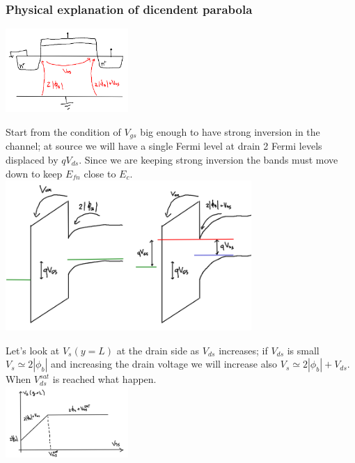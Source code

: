 \subsubsection{Physical explanation of dicendent parabola}


\centering
\includegraphics[width=0.35\textwidth]{f1.png}\\
\raggedright

Start from the condition of $V_{gs}$ big enough to have strong inversion in the channel; at source we will have a single Fermi level at drain 2 Fermi levels displaced by $qV_{ds}$. Since we are keeping strong inversion the bands must move down to keep $E_{fn}$ close to $E_c$.\\

\centering
\includegraphics[width=0.7\textwidth]{f2.png}\\
\raggedright


Let's look at $V_s(y=L)$ at the drain side as $V_{ds}$ increases; if $V_{ds}$ is small $V_s\simeq 2|\phi_b|$ and increasing the drain voltage we will increase also $V_s\simeq 2|\phi_b|+V_{ds}$. When $V_{ds}^{sat}$ is reached what happen.\\


\centering
\includegraphics[width=0.35\textwidth]{f3.png}\\
\raggedright


